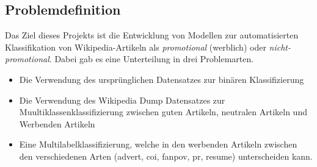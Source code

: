 
\subsection{Problemdefinition}
\label{Problemdefinition}
Das Ziel dieses Projekts ist die Entwicklung von Modellen zur automatisierten Klassifikation von Wikipedia-Artikeln als \emph{promotional} (werblich) oder \emph{nicht-promotional}. Dabei gab es eine Unterteilung in drei Problemarten.
\begin{itemize}
    \item Die Verwendung des ursprünglichen Datensatzes zur binären Klassifizierung
    \item Die Verwendung des Wikipedia Dump Datensatzes zur Muultiklassenklassifizierung zwischen guten Artikeln, neutralen Artikeln und Werbenden Artikeln
    \item Eine Multilabelklassifizierung, welche in den werbenden Artikeln zwischen den verschiedenen Arten (advert, coi, fanpov, pr, resume) unterscheiden kann.
\end{itemize}



